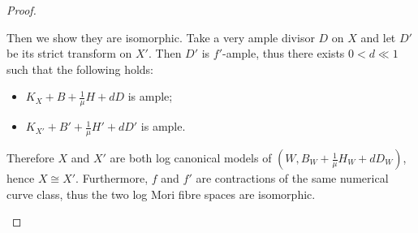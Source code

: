 \documentclass[11pt]{amsart}
\begin{document}
\begin{proof}
\begin{enumerate}
Then we show they are isomorphic. Take a very ample divisor $ D $ on $ X $ and let $ D'  $ be its strict transform on $ X' $. Then $ D' $ is $ f' $-ample, thus there exists $ 0<d\ll1 $ such that the following holds:
      \begin{itemize}
        \item $ K_X+B+\frac{1}{\mu }H+dD $ is ample;
        \item $ K_{X'}+B'+\frac{1}{\mu }H'+dD' $ is ample.
      \end{itemize}
  Therefore $X$ and $X'$ are both log canonical models of $(W,B_{W}+\frac{1}{\mu}H_{W}+dD_{W})$, hence $X\cong X'$. Furthermore, $f$ and  $f'$ are contractions of the same numerical curve class, thus the two log Mori fibre spaces are isomorphic.
\end{enumerate}
\end{proof}
\end{document}
